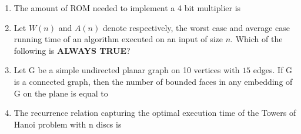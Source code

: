 \documentclass[journal]{IEEEtran}
\numberwithin{equation}{enumi}
\numberwithin{figure}{enumi}
\begin{document}
\begin{enumerate}
\item The amount of ROM needed to implement a 4 bit multiplier is
\begin{enumerate}
\end{enumerate}

\item Let $W(n)$ and $A(n)$ denote respectively, the worst case and average case running time of an algorithm executed on an input of size $n$.  
Which of the following is \textbf{ALWAYS TRUE}?
\begin{enumerate}
\end{enumerate}

\item Let G be a simple undirected planar graph on 10 vertices with $15$ edges. If G is a connected graph, then the number of bounded faces in any embedding of G on the plane is equal to 
\begin{enumerate}
\end{enumerate}

\item The recurrence relation capturing the optimal execution time of the Towers of Hanoi problem
with n discs is
\begin{enumerate}
\end{enumerate}


\end{enumerate}
\end{document}
